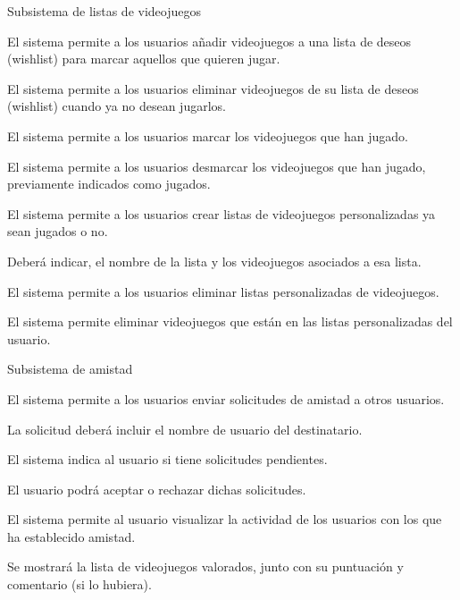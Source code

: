 \begin{functional}
    \item Subsistema de listas de videojuegos
    \begin{functional}
        \item El sistema permite a los usuarios añadir videojuegos a una lista de deseos (wishlist) para marcar aquellos que quieren jugar. 
        \item El sistema permite a los usuarios eliminar videojuegos de su lista de deseos (wishlist) cuando ya no desean jugarlos.
        \item El sistema permite a los usuarios marcar los videojuegos que han jugado.
        \item El sistema permite a los usuarios desmarcar los videojuegos que han jugado, previamente indicados como jugados.
        \item El sistema permite a los usuarios crear listas de videojuegos personalizadas ya sean jugados o no.
        \begin{functional}
            \item Deberá indicar, el nombre de la lista y los videojuegos asociados a esa lista.
        \end{functional}
        \item El sistema permite a los usuarios eliminar listas personalizadas de videojuegos. 
        \item El sistema permite eliminar videojuegos que están en las listas personalizadas del usuario.
    \end{functional}

    \item Subsistema de amistad
    \begin{functional}
        \item El sistema permite a los usuarios enviar solicitudes de amistad a otros usuarios.
        \begin{functional}
            \item La solicitud deberá incluir el nombre de usuario del destinatario.
        \end{functional}
        \item El sistema indica al usuario si tiene solicitudes pendientes.
        \begin{functional}
            \item El usuario podrá aceptar o rechazar dichas solicitudes.
        \end{functional}
        \item El sistema permite al usuario visualizar la actividad de los usuarios con los que ha establecido amistad.
        \begin{functional}
            \item Se mostrará la lista de videojuegos valorados, junto con su puntuación y comentario (si lo hubiera).
        \end{functional}
    \end{functional}


\end{functional}
